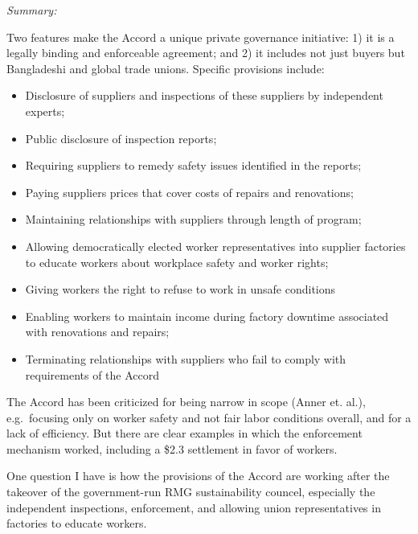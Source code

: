 \documentclass[
  12pt,
]{article}
\providecommand{\tightlist}{%
  \setlength{\itemsep}{0pt}\setlength{\parskip}{0pt}}
\begin{document}
\emph{Summary:}

Two features make the Accord a unique private governance initiative: 1)
it is a legally binding and enforceable agreement; and 2) it includes
not just buyers but Bangladeshi and global trade unions. Specific
provisions include:

\begin{itemize}
\tightlist
\item
  Disclosure of suppliers and inspections of these suppliers by
  independent experts;
\item
  Public disclosure of inspection reports;
\item
  Requiring suppliers to remedy safety issues identified in the reports;
\item
  Paying suppliers prices that cover costs of repairs and renovations;
\item
  Maintaining relationships with suppliers through length of program;
\item
  Allowing democratically elected worker representatives into supplier
  factories to educate workers about workplace safety and worker rights;
\item
  Giving workers the right to refuse to work in unsafe conditions
\item
  Enabling workers to maintain income during factory downtime associated
  with renovations and repairs;
\item
  Terminating relationships with suppliers who fail to comply with
  requirements of the Accord
\end{itemize}

The Accord has been criticized for being narrow in scope (Anner et.
al.), e.g.~focusing only on worker safety and not fair labor conditions
overall, and for a lack of efficiency. But there are clear examples in
which the enforcement mechanism worked, including a \$2.3 settlement in
favor of workers.

One question I have is how the provisions of the Accord are working
after the takeover of the government-run RMG sustainability councel,
especially the independent inspections, enforcement, and allowing union
representatives in factories to educate workers.

\bigbreak

\end{document}
